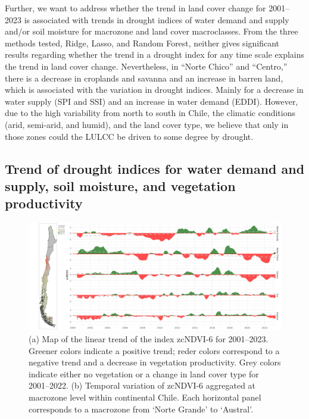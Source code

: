 \documentclass[
  authoryear,
  preprint,
  3p,
  onecolumn]{elsarticle}
\begin{document}
Further, we want to address whether the trend in land cover change for
2001--2023 is associated with trends in drought indices of water demand
and supply and/or soil moisture for macrozone and land cover
macroclasses. From the three methods tested, Ridge, Lasso, and Random
Forest, neither gives significant results regarding whether the trend in
a drought index for any time scale explains the trend in land cover
change. Nevertheless, in ``Norte Chico'' and ``Centro,'' there is a
decrease in croplands and savanna and an increase in barren land, which
is associated with the variation in drought indices. Mainly for a
decrease in water supply (SPI and SSI) and an increase in water demand
(EDDI). However, due to the high variability from north to south in
Chile, the climatic conditions (arid, semi-arid, and humid), and the
land cover type, we believe that only in those zones could the LULCC be
driven to some degree by drought.

\hypertarget{trend-of-drought-indices-for-water-demand-and-supply-soil-moisture-and-vegetation-productivity-1}{%
\subsection{Trend of drought indices for water demand and supply, soil
moisture, and vegetation
productivity}\label{trend-of-drought-indices-for-water-demand-and-supply-soil-moisture-and-vegetation-productivity-1}}

\begin{figure}[!ht]

{\centering \includegraphics{../output/figs/temporal_variation_zcNDVI6_macrozonas_con_mapa.png}

}

\caption{\label{fig-zcNDVI_var}(a) Map of the linear trend of the index
zcNDVI-6 for 2001--2023. Greener colors indicate a positive trend; reder
colors correspond to a negative trend and a decrease in vegetation
productivity. Grey colors indicate either no vegetation or a change in
land cover type for 2001--2022. (b) Temporal variation of zcNDVI-6
aggregated at macrozone level within continental Chile. Each horizontal
panel corresponds to a macrozone from `Norte Grande' to `Austral'.}

\end{figure}
\end{document}
